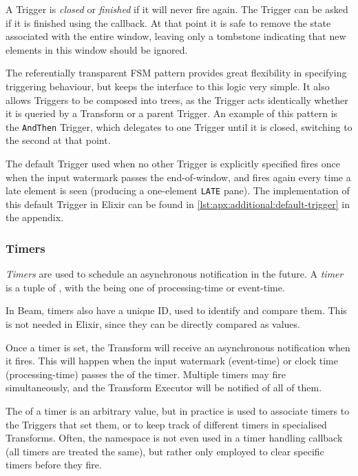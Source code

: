 A Trigger is \emph{closed} or \emph{finished} if it will never fire again.
The Trigger can be asked if it is finished using the  callback.
At that point it is safe to remove the state associated with the entire window, leaving only a tombstone indicating that new elements in this window should be ignored.

The referentially transparent FSM pattern provides great flexibility in specifying triggering behaviour, but keeps the interface to this logic very simple.
It also allows Triggers to be composed into trees, as the Trigger acts identically whether it is queried by a Transform or a parent Trigger.
An example of this pattern is the \verb|AndThen| Trigger, which delegates to one Trigger until it is closed, switching to the second at that point.

The default Trigger used when no other Trigger is explicitly specified fires once when the input watermark passes the end-of-window, and fires again every time a late element is seen (producing a one-element \verb|LATE| pane).
The implementation of this default Trigger in Elixir can be found in \cref{lst:apx:additional:default-trigger} in the appendix.

\subsubsection{Timers}

\emph{Timers} are used to schedule an asynchronous notification in the future.
A \emph{timer} is a tuple of \footnotemark, with the  being one of processing-time or event-time.

\footnotetext
{
In Beam, timers also have a unique ID, used to identify and compare them. This is not needed in Elixir, since they can be directly compared as values.
}

Once a timer is set, the Transform will receive an asynchronous notification when it fires.
This will happen when the input watermark (event-time) or clock time (processing-time) passes the  of the timer.
Multiple timers may fire simultaneously, and the Transform Executor will be notified of all of them.

The  of a timer is an arbitrary value, but in practice is used to associate timers to the Triggers that set them, or to keep track of different timers in specialised Transforms.
Often, the namespace is not even used in a timer handling callback (all timers are treated the same), but rather only employed to clear specific timers before they fire.

